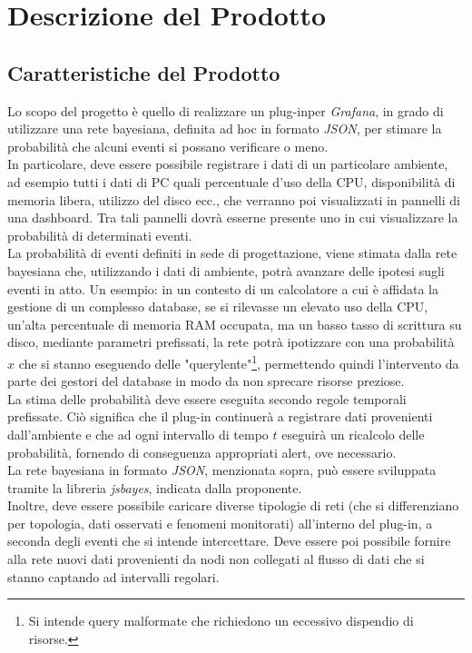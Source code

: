 \section{Descrizione del Prodotto}\label{DescrizioneProdotto}

\subsection{Caratteristiche del Prodotto}\label{CaratteristicheProdotto}
Lo scopo del progetto è quello di realizzare un plug-in\glossario per \textit{Grafana}\glossario, in grado di utilizzare una rete bayesiana\glossario, definita ad hoc in formato \textit{JSON}\glossario, per stimare la probabilità che alcuni eventi si possano verificare o meno.\\
In particolare, deve essere possibile registrare i dati di un particolare ambiente, ad esempio tutti i dati di PC quali percentuale d'uso della CPU, disponibilità di memoria libera, utilizzo del disco ecc., che verranno poi visualizzati in pannelli di una dashboard\glossario. Tra tali pannelli dovrà esserne presente uno in cui visualizzare la probabilità di determinati eventi.\\
La probabilità di eventi definiti in sede di progettazione, viene stimata dalla rete bayesiana che, utilizzando i dati di ambiente, potrà avanzare delle ipotesi sugli eventi in atto. Un esempio: in un contesto di un calcolatore a cui è affidata la gestione di un complesso database\glossario, se si rilevasse un elevato uso della CPU, un'alta percentuale di memoria RAM occupata, ma un basso tasso di scrittura su disco, mediante parametri prefissati, la rete potrà ipotizzare con una probabilità $x$ che si stanno eseguendo delle "query\glossario lente"\footnote{Si intende query malformate che richiedono un eccessivo dispendio di risorse.}, permettendo quindi l'intervento da parte dei gestori del database in modo da non sprecare risorse preziose.\\
La stima delle probabilità deve essere eseguita secondo regole temporali prefissate. Ciò significa che il plug-in continuerà a registrare dati provenienti dall'ambiente e che ad ogni intervallo di tempo $t$ eseguirà un ricalcolo delle probabilità, fornendo di conseguenza appropriati alert, ove necessario.\\
La rete bayesiana in formato \textit{JSON}, menzionata sopra, può essere sviluppata tramite la libreria \textit{jsbayes}\glossario, indicata dalla proponente.\\
Inoltre, deve essere possibile caricare diverse tipologie di reti (che si differenziano per topologia, dati osservati e fenomeni monitorati) all'interno del plug-in, a seconda degli eventi che si intende intercettare. Deve essere poi possibile fornire alla rete nuovi dati provenienti da nodi non collegati al flusso di dati che si stanno captando ad intervalli regolari.

